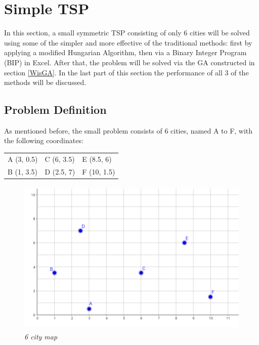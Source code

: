 \section{Simple TSP}
\label{SimpleTSP}


In this section, a small symmetric TSP consisting of only 6 cities will be solved using some of the simpler and more effective of the traditional methods: first by applying a modified Hungarian Algorithm, then via a Binary Integer Program (BIP) in Excel. After that, the problem will be solved via the GA constructed in section \ref{WisGA}. In the last part of this section the performance of all 3 of the methods will be discussed.

\subsection{Problem Definition}

As mentioned before, the small problem consists of 6 cities, named A to F, with the following coordinates:

\vspace{-1mm}

\begin{table}[H] 
\center
\begin{tabular}{l l l}

A (3, 0.5)   & C (6, 3.5) & E (8.5, 6) \\
B (1, 3.5)   & D (2.5, 7) &F (10, 1.5)\\

\end{tabular}
\end{table}

\vspace{-1mm}

\begin{figure}[ht] 
\centering
\includegraphics[height=7.5cm]{6citymap}
\caption{\textsl{6 city map}}
\label{6citymap}
\end{figure}

